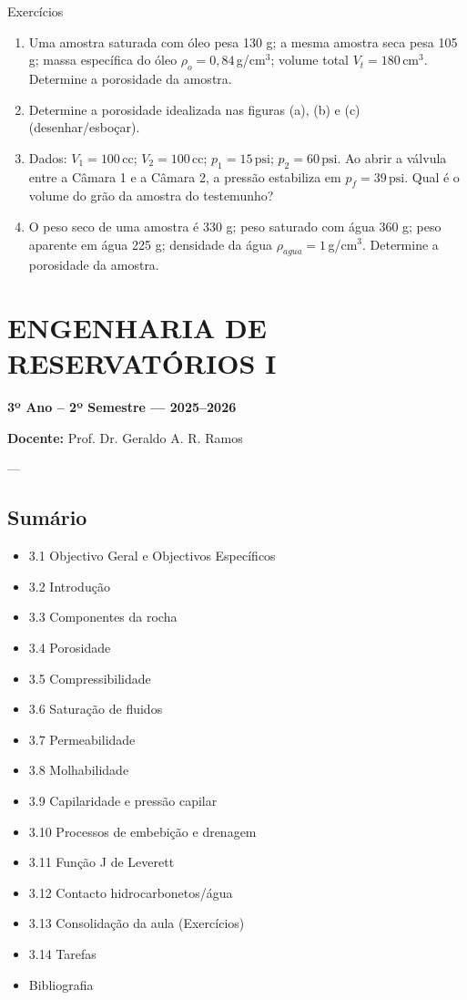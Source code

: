 \documentclass[11pt,a4paper]{article}
\begin{document}
Exercícios
\begin{enumerate}
\item Uma amostra saturada com óleo pesa 130 g; a mesma amostra seca pesa 105 g; massa específica do óleo $\rho_o=0{,}84\,$g/cm$^3$; volume total $V_t=180\,$cm$^3$. Determine a porosidade da amostra.
\item Determine a porosidade idealizada nas figuras (a), (b) e (c) (desenhar/esboçar).
\item Dados: $V_1=100\,$cc; $V_2=100\,$cc; $p_1=15{\,}\text{psi}$; $p_2=60{\,}\text{psi}$. Ao abrir a válvula entre a Câmara 1 e a Câmara 2, a pressão estabiliza em $p_f=39{\,}\text{psi}$. Qual é o volume do grão da amostra do testemunho?
\item O peso seco de uma amostra é 330 g; peso saturado com água 360 g; peso aparente em água 225 g; densidade da água $\rho_{agua}=1\,$g/cm$^3$. Determine a porosidade da amostra.
\end{enumerate}


\section{ENGENHARIA DE RESERVATÓRIOS I}
\textbf{3º Ano – 2º Semestre — 2025–2026}

\textbf{Docente:} Prof. Dr. Geraldo A. R. Ramos

---

\subsection{Sumário}
\begin{itemize}
\item 3.1 Objectivo Geral e Objectivos Específicos
\item 3.2 Introdução
\item 3.3 Componentes da rocha
\item 3.4 Porosidade
\item 3.5 Compressibilidade
\item 3.6 Saturação de fluidos
\item 3.7 Permeabilidade
\item 3.8 Molhabilidade
\item 3.9 Capilaridade e pressão capilar
\item 3.10 Processos de embebição e drenagem
\item 3.11 Função J de Leverett
\item 3.12 Contacto hidrocarbonetos/água
\item 3.13 Consolidação da aula (Exercícios)
\item 3.14 Tarefas
\item Bibliografia
\end{itemize}
\end{document}
